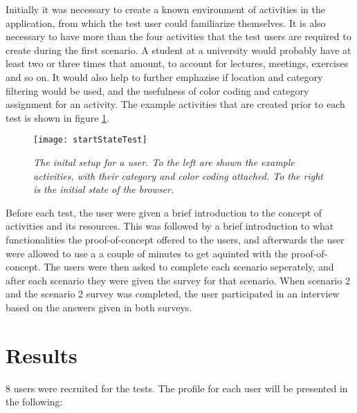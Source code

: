 Initially it was necessary to create a known environment of activities in the application, from which the test user could familiarize themselves. It is also necessary to have more than the four activities that the test users are required to create during the first scenario. A student at a university would probably have at least two or three times that amount, to account for lectures, meetings, exercises and so on. It would also help to further emphazise if location and category filtering would be used, and the usefulness of color coding and category assignment for an activity. The example activities that are created prior to each test is shown in figure \ref{fig:initial}.

\begin{figure}[ht!]
  \centering
    \texttt{[image: startStateTest]}
  \caption{\emph{The inital setup for a user. To the left are shown the example activities, with their category and color coding attached. To the right is the initial state of the browser.}}
  \label{fig:initial}
\end{figure}

Before each test, the user were given a brief introduction to the concept of activities and its resources. This was followed by a brief introduction to what functionalities the proof-of-concept offered to the users, and afterwards the user were allowed to use a a couple of minutes to get aquinted with the proof-of-concept. The users were then asked to complete each scenario seperately, and after each scenario they were given the survey for that scenario. When scenario 2 and the scenario 2 survey was completed, the user participated in an interview based on the answers given in both surveys.

\section{Results}
8 users were recruited for the tests. The profile for each user will be presented in the following:

